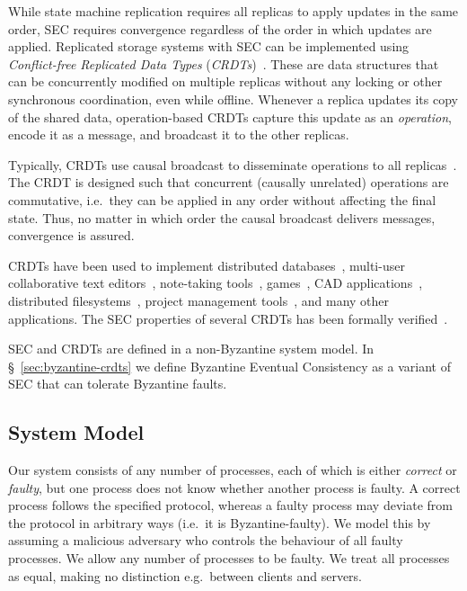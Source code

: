 \documentclass[a4paper,anonymous,USenglish]{lipics-v2019}
\begin{document}
While state machine replication requires all replicas to apply updates in the same order, SEC requires convergence regardless of the order in which updates are applied.
Replicated storage systems with SEC can be implemented using \emph{Conflict-free Replicated Data Types} (\emph{CRDTs})~\cite{Shapiro:2011}.
These are data structures that can be concurrently modified on multiple replicas without any locking or other synchronous coordination, even while offline.
Whenever a replica updates its copy of the shared data, operation-based CRDTs capture this update as an \emph{operation}, encode it as a message, and broadcast it to the other replicas.

Typically, CRDTs use causal broadcast to disseminate operations to all replicas~\cite{Gomes:2017gy,Shapiro:2011}.
The CRDT is designed such that concurrent (causally unrelated) operations are commutative, i.e.\ they can be applied in any order without affecting the final state.
Thus, no matter in which order the causal broadcast delivers messages, convergence is assured.

CRDTs have been used to implement distributed databases~\cite{Akkoorath2016Cure,Brown2016bigsets,Zawirski2015SwiftCloud}, multi-user collaborative text editors~\cite{AhmedNacer:2011ke,Nedelec:2016eo,Weiss:2009ht}, note-taking tools~\cite{vanHardenberg2020PushPin}, games~\cite{vanderLinde:2017fu}, CAD applications~\cite{Lv:2018ie}, distributed filesystems~\cite{Najafzadeh:2018bw,Tao:2015gd}, project management tools~\cite{Kleppmann2019localfirst}, and many other applications.
The SEC properties of several CRDTs has been formally verified~\cite{Gomes:2017gy,Zeller:2014fl}.

SEC and CRDTs are defined in a non-Byzantine system model.
In \S~\ref{sec:byzantine-crdts} we define Byzantine Eventual Consistency as a variant of SEC that can tolerate Byzantine faults.

\subsection{System Model}\label{sec:system-model}

Our system consists of any number of processes, each of which is either \emph{correct} or \emph{faulty}, but one process does not know whether another process is faulty.
A correct process follows the specified protocol, whereas a faulty process may deviate from the protocol in arbitrary ways (i.e.\ it is Byzantine-faulty).
We model this by assuming a malicious adversary who controls the behaviour of all faulty processes.
We allow any number of processes to be faulty.
We treat all processes as equal, making no distinction e.g.\ between clients and servers.
\end{document}
